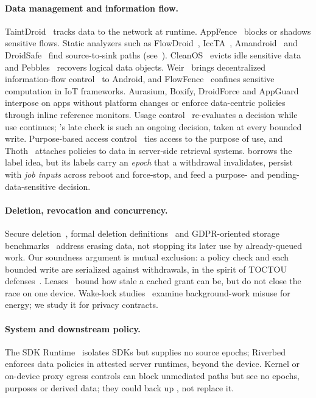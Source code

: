 \paragraph{Data management and information flow.} TaintDroid~\cite{enck2010taintdroid} tracks data to the network at
runtime. AppFence~\cite{hornyack2011appfence} blocks or shadows sensitive flows. Static analyzers such as
FlowDroid~\cite{arzt2014flowdroid}, IccTA~\cite{li2015iccta}, Amandroid~\cite{wei2014amandroid} and
DroidSafe~\cite{gordon2015droidsafe} find source-to-sink paths (see~\cite{li2017staticsurvey}). CleanOS~\cite{tang2012cleanos}
evicts idle sensitive data and Pebbles~\cite{spahn2014pebbles} recovers logical data objects. Weir~\cite{nadkarni2016weir} brings decentralized information-flow control~\cite{myers1997difc,efstathopoulos2005asbestos,zeldovich2006histar,krohn2007flume}
to Android, and FlowFence~\cite{fernandes2016flowfence} confines sensitive computation in IoT frameworks. Aurasium, Boxify, DroidForce and
AppGuard~\cite{xu2012aurasium,backes2015boxify,rasthofer2014droidforce,backes2013appguard} interpose on apps without
platform changes or enforce data-centric policies through inline reference monitors. Usage control~\cite{park2004ucon} re-evaluates a decision while use continues;
\sys's late check is such an ongoing decision, taken at every bounded write. Purpose-based access
control~\cite{byun2008purpose} ties access to the purpose of use, and Thoth~\cite{elnikety2016thoth} attaches policies to
data in server-side retrieval systems. \sys borrows the label idea, but its labels carry an \emph{epoch} that a withdrawal
invalidates, persist with \emph{job inputs} across reboot and force-stop, and feed a purpose- and pending-data-sensitive
decision.

\paragraph{Deletion, revocation and concurrency.} Secure deletion~\cite{reardon2013deletion}, formal deletion
definitions~\cite{garg2020deletion} and GDPR-oriented storage benchmarks~\cite{shastri2020gdprbench} address erasing data,
not stopping its later use by already-queued work. Our soundness argument is mutual exclusion: a policy
check and each bounded write are serialized against withdrawals, in the spirit of TOCTOU defenses~\cite{bishop1996races}. Leases~\cite{gray1989leases} bound how stale a cached grant can be, but do
not close the race on one device. Wake-lock studies~\cite{liu2016wakelock} examine background-work misuse for energy; we
study it for privacy contracts.

\paragraph{System and downstream policy.} The SDK Runtime~\cite{android_sdkruntime} isolates SDKs but supplies no source epochs; Riverbed~\cite{wang2019riverbed} enforces data policies in attested server runtimes, beyond the device. Kernel or on-device proxy egress controls can block unmediated paths but see no epochs, purposes or derived data; they could back up \sys, not replace it.
